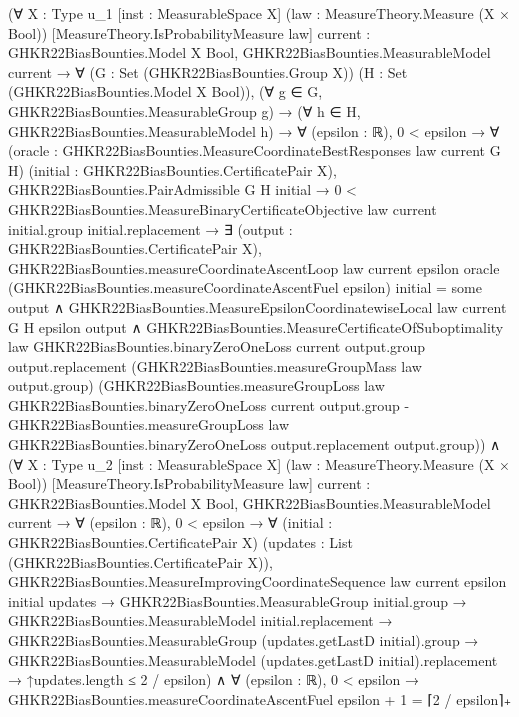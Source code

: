 \documentclass[10pt]{article}
\begin{document}
\begin{ReviewVerbatim}
(∀ {X : Type u_1} [inst : MeasurableSpace X] (law : MeasureTheory.Measure (X × Bool))
    [MeasureTheory.IsProbabilityMeasure law] {current : GHKR22BiasBounties.Model X Bool},
    GHKR22BiasBounties.MeasurableModel current →
      ∀ (G : Set (GHKR22BiasBounties.Group X)) (H : Set (GHKR22BiasBounties.Model X Bool)),
        (∀ g ∈ G, GHKR22BiasBounties.MeasurableGroup g) →
          (∀ h ∈ H, GHKR22BiasBounties.MeasurableModel h) →
            ∀ (epsilon : ℝ),
              0 < epsilon →
                ∀ (oracle : GHKR22BiasBounties.MeasureCoordinateBestResponses law current G H)
                  (initial : GHKR22BiasBounties.CertificatePair X),
                  GHKR22BiasBounties.PairAdmissible G H initial →
                    0 <
                        GHKR22BiasBounties.MeasureBinaryCertificateObjective law current initial.group
                          initial.replacement →
                      ∃ (output : GHKR22BiasBounties.CertificatePair X),
                        GHKR22BiasBounties.measureCoordinateAscentLoop law current epsilon oracle
                              (GHKR22BiasBounties.measureCoordinateAscentFuel epsilon) initial =
                            some output ∧
                          GHKR22BiasBounties.MeasureEpsilonCoordinatewiseLocal law current G H epsilon output ∧
                            GHKR22BiasBounties.MeasureCertificateOfSuboptimality law
                              GHKR22BiasBounties.binaryZeroOneLoss current output.group output.replacement
                              (GHKR22BiasBounties.measureGroupMass law output.group)
                              (GHKR22BiasBounties.measureGroupLoss law GHKR22BiasBounties.binaryZeroOneLoss current
                                  output.group -
                                GHKR22BiasBounties.measureGroupLoss law GHKR22BiasBounties.binaryZeroOneLoss
                                  output.replacement output.group)) ∧
  (∀ {X : Type u_2} [inst : MeasurableSpace X] (law : MeasureTheory.Measure (X × Bool))
      [MeasureTheory.IsProbabilityMeasure law] {current : GHKR22BiasBounties.Model X Bool},
      GHKR22BiasBounties.MeasurableModel current →
        ∀ (epsilon : ℝ),
          0 < epsilon →
            ∀ (initial : GHKR22BiasBounties.CertificatePair X) (updates : List (GHKR22BiasBounties.CertificatePair X)),
              GHKR22BiasBounties.MeasureImprovingCoordinateSequence law current epsilon initial updates →
                GHKR22BiasBounties.MeasurableGroup initial.group →
                  GHKR22BiasBounties.MeasurableModel initial.replacement →
                    GHKR22BiasBounties.MeasurableGroup (updates.getLastD initial).group →
                      GHKR22BiasBounties.MeasurableModel (updates.getLastD initial).replacement →
                        ↑updates.length ≤ 2 / epsilon) ∧
    ∀ (epsilon : ℝ), 0 < epsilon → GHKR22BiasBounties.measureCoordinateAscentFuel epsilon + 1 = ⌈2 / epsilon⌉₊
\end{ReviewVerbatim}
\end{document}
